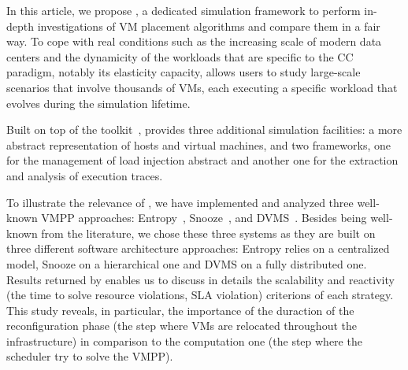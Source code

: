 In this article, we propose \vmps, a dedicated simulation framework to
perform in-depth investigations of VM placement algorithms and compare
them in a fair way. To cope with real conditions such as the
increasing scale of modern data centers and the dynamicity of the
workloads that are specific to the CC paradigm, notably its elasticity
capacity, \vmps allows users to study large-scale scenarios
that involve thousands of VMs,
each executing a specific workload that evolves during the
simulation lifetime.

Built on top of the \sg toolkit~\cite{casanova:hal-01017319}, \vmps
provides three additional simulation facilities: a more abstract
representation of hosts and virtual machines, and two frameworks, one
for the management of load injection abstract and another one for the
extraction and analysis of execution traces.

%

To illustrate the relevance of \vmps, we have implemented and analyzed
three well-known VMPP approaches:
Entropy~\cite{Hermenier:2009:ECM:1508293.1508300},
Snooze~\cite{feller:ccgrid12}, and DVMS~\cite{quesnel:cpe2012}.
Besides being well-known from the literature, we chose
these three systems as they are built on three different software
architecture approaches: Entropy relies on a centralized model, Snooze
on a hierarchical one and DVMS on a fully distributed one.
Results returned by \vmps enables us to discuss in details the
scalability and reactivity (\ie the time to solve
resource violations, \aka SLA violation) criterions of each strategy.
This study reveals, in particular, the importance of the duraction of
the reconfiguration phase (\ie the step where VMs are relocated throughout the infrastructure) in
comparison to the computation one (\ie the step where the scheduler try to solve the VMPP).


